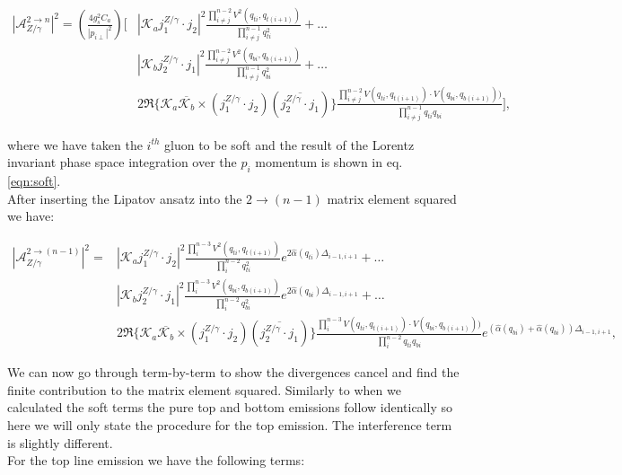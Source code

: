 		\begin{align}
			|\mathcal{A}_{Z/\gamma}^{2\rightarrow n}|^2 = \left(\frac{4g_s^2C_a}{|p_{i\perp}|^2}\right)
				\Bigg[&\left|\mathcal{K}_a j_1^{Z/\gamma}\cdot j_2\right|^2 \frac{\prod^{n-2}_{i\neq j}V^2(q_{ti},
				q_{t(i+1)})}{\prod^{n-1}_{i\neq j}q^2_{ti}} + \ldots \\&\left|\mathcal{K}_b j_2^{Z/\gamma}\cdot j_1\right|^2
				\frac{\prod^{n-2}_{i\neq j}V^2(q_{bi}, q_{b(i+1)})}{\prod^{n-1}_{i\neq j}q^2_{bi}} + \ldots \\
				&2\Re\{\mathcal{K}_a\overline{\mathcal{K}_b} \times (j_1^{Z/\gamma}\cdot j_2)(\overline{j_2^{Z/\gamma}\cdot j_1})\}
				\frac{\prod^{n-2}_{i\neq j}V(q_{ti}, q_{t(i+1)})\cdot V(q_{bi}, q_{b(i+1)}))}{\prod^{n-1}_{i\neq j}q_{ti}q_{bi}}\Bigg],
		\end{align}

		where we have taken the $i^{th}$ gluon to be soft and the result of the Lorentz invariant phase space
		integration over the $p_i$ momentum is shown in eq. \eqref{eqn:soft}.\\After inserting the Lipatov
		ansatz into the $2\rightarrow (n-1)$ matrix element squared we have:

		\begin{align}
			|\mathcal{A}_{Z/\gamma}^{2\rightarrow (n-1)}|^2 = &\left|\mathcal{K}_a j_1^{Z/\gamma}\cdot j_2\right|^2
				\frac{\prod^{n-3}_{i}V^2(q_{ti}, q_{t(i+1)})}{\prod^{n-2}_{i}q^2_{ti}}e^{2\hat{\alpha}(q_{ti})\Delta_{i-1,i+1}} + \ldots \\
				&\left|\mathcal{K}_b j_2^{Z/\gamma}\cdot j_1\right|^2 \frac{\prod^{n-3}_{i}V^2(q_{bi}, q_{b(i+1)})}
				{\prod^{n-2}_{i}q^2_{bi}}e^{2\hat{\alpha}(q_{bi})\Delta_{i-1,i+1}} + \ldots \\
				&2\Re\{\mathcal{K}_a\overline{\mathcal{K}_b} \times (j_1^{Z/\gamma}\cdot j_2)(\overline{j_2^{Z/\gamma}\cdot j_1})\}
				\frac{\prod^{n-3}_{i}V(q_{ti}, q_{t(i+1)})\cdot V(q_{bi}, q_{b(i+1)}))}{\prod^{n-2}_{i}q_{ti}q_{bi}}
				e^{(\hat{\alpha}(q_{bi}) + \hat{\alpha}(q_{bi}))\Delta_{i-1,i+1}},
		\end{align}

		We can now go through term-by-term to show the divergences cancel and find the finite contribution to
		the matrix element squared.  Similarly to when we calculated the soft terms the pure top and bottom
		emissions follow identically so here we will only state the procedure for the top emission.  The
		interference term is slightly different.\\For the top line emission we have the following terms:

